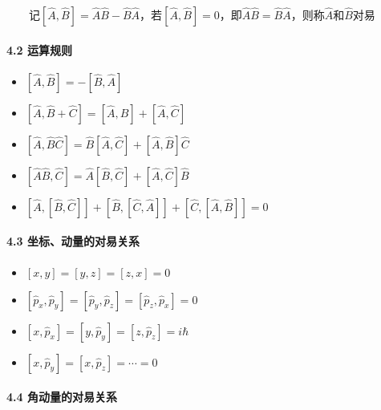 \documentclass[UTF8,twocolumn]{ctexart}
\providecommand{\tightlist}{%
  \setlength{\itemsep}{0pt}\setlength{\parskip}{0pt}}
\let\oldparagraph\paragraph
\renewcommand{\paragraph}[1]{\oldparagraph{#1}\mbox{}}
\begin{document}
  记\([\hat{A},\hat{B}]=\hat{A}\hat{B}-\hat{B}\hat{A}\)，若\([\hat{A},\hat{B}]=0\)，即\(\hat{A}\hat{B}=\hat{B}\hat{A}\)，则称\(\hat{A}\)和\(\hat{B}\)对易

\hypertarget{ux8fd0ux7b97ux89c4ux5219}{%
\paragraph{ 4.2 运算规则}\label{ux8fd0ux7b97ux89c4ux5219}}

\begin{itemize}
\tightlist
\item
  \([\hat{A},\hat{B}]=-[\hat{B},\hat{A}]\)
\item
  \([\hat{A},\hat{B}+\hat{C}]=[\hat{A},\hat{B}]+[\hat{A},\hat{C}]\)
\item
  \([\hat{A},\hat{B}\hat{C}]=\hat{B}[\hat{A},\hat{C}]+[\hat{A},\hat{B}]\hat{C}\)
\item
  \([\hat{A}\hat{B},\hat{C}]=\hat{A}[\hat{B},\hat{C}]+[\hat{A},\hat{C}]\hat{B}\)
\item
  \([\hat{A},[\hat{B},\hat{C}]]+[\hat{B},[\hat{C},\hat{A}]]+[\hat{C},[\hat{A},\hat{B}]]=0\)
\end{itemize}

\hypertarget{ux5750ux6807ux52a8ux91cfux7684ux5bf9ux6613ux5173ux7cfb}{%
\paragraph{ 4.3
坐标、动量的对易关系}\label{ux5750ux6807ux52a8ux91cfux7684ux5bf9ux6613ux5173ux7cfb}}

\begin{itemize}
\tightlist
\item
  \([x,y]=[y,z]=[z,x]=0\)
\item
  \([\hat{p}_x,\hat{p}_y]=[\hat{p}_y,\hat{p}_z]=[\hat{p}_z,\hat{p}_x]=0\)
\item
  \([x,\hat{p}_x]=[y,\hat{p}_y]=[z,\hat{p}_z]=i\hbar\)
\item
  \([x,\hat{p}_y]=[x,\hat{p}_z]=\cdots=0\)
\end{itemize}

\hypertarget{ux89d2ux52a8ux91cfux7684ux5bf9ux6613ux5173ux7cfb}{%
\paragraph{ 4.4
角动量的对易关系}\label{ux89d2ux52a8ux91cfux7684ux5bf9ux6613ux5173ux7cfb}}
\end{document}

